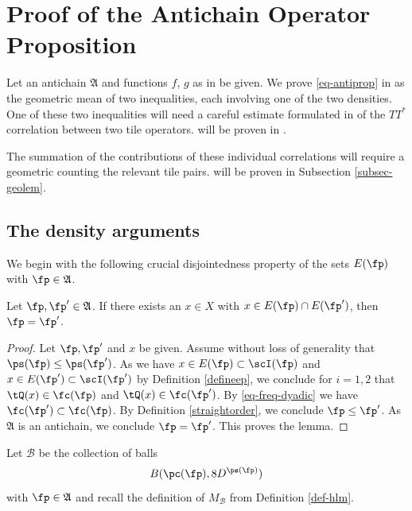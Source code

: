\chapter{Proof of the Antichain Operator Proposition}

\label{antichainboundary}

Let an antichain $\mathfrak{A}$
and functions $f$, $g$ as in  be given.
We prove \eqref{eq-antiprop}
in 
as the geometric mean of two inequalities,
each involving one of the two densities.
One of these two inequalities will need a careful estimate formulated in
 of
the $TT^*$ correlation between two tile operators.
 will be proven in
.

The summation of the contributions of these individual correlations will require a
geometric  counting the relevant tile pairs.
 will be proven in Subsection
\ref{subsec-geolem}.






\section{The density arguments}\label{sec-TT*-T*T}

We begin with the following crucial disjointedness property of the sets $E(\fp)$ with $\fp \in \mathfrak{A}$.
\begin{lemma}
\label{tile-disjointness}
\leanok
Let $\fp,\fp'\in \mathfrak{A}$.
If there exists an $x\in X$ with $x\in E(\fp)\cap E(\fp')$,
then $\fp= \fp'$.
\end{lemma}
\begin{proof}\leanok
Let $\fp,\fp'$ and $x$ be given.
Assume without loss of generality that $\ps(\fp)\le \ps(\fp')$.
As we have $x\in E(\fp)\subset \scI(\fp)$ and $x\in E(\fp')\subset \scI(\fp')$ by Definition \eqref{defineep}, we conclude
for $i=1,2$ that
$\tQ(x)\in\fc(\fp)$ and $\tQ(x)\in\fc(\fp')$. By \eqref{eq-freq-dyadic} we have $\fc(\fp')\subset \fc(\fp)$. By Definition
\eqref{straightorder}, we conclude $\fp\le \fp'$. As $\mathfrak{A}$ is an antichain, we conclude $\fp=\fp'$.
This proves the lemma.
\end{proof}



Let $\mathcal{B}$ be the collection of balls
\begin{equation}
    B(\pc(\fp), 8D^{\ps(\fp)})
\end{equation}
with $\fp\in \mathfrak{A}$ and recall the definition of
$M_{\mathcal{B}}$ from Definition \ref{def-hlm}.

